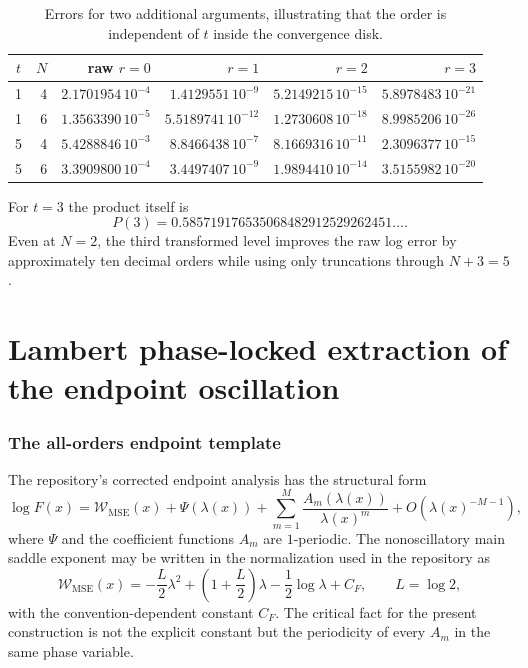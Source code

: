 \documentclass[11pt]{article}
\theoremstyle{definition}
\theoremstyle{remark}
\begin{document}
\begin{table}[htbp]
\centering
\caption{Errors for two additional arguments, illustrating that the order is independent of $t$ inside the convergence disk.}
\label{tab:numeric-other}
\begin{tabular}{@{}c r r r r r@{}}
\toprule
$t$ & $N$ & raw $r=0$ & $r=1$ & $r=2$ & $r=3$ \\
\midrule
1 & 4 & $2.1701954\,10^{-4}$ & $1.4129551\,10^{-9}$ & $5.2149215\,10^{-15}$ & $5.8978483\,10^{-21}$ \\
1 & 6 & $1.3563390\,10^{-5}$ & $5.5189741\,10^{-12}$ & $1.2730608\,10^{-18}$ & $8.9985206\,10^{-26}$ \\
5 & 4 & $5.4288846\,10^{-3}$ & $8.8466438\,10^{-7}$ & $8.1669316\,10^{-11}$ & $2.3096377\,10^{-15}$ \\
5 & 6 & $3.3909800\,10^{-4}$ & $3.4497407\,10^{-9}$ & $1.9894410\,10^{-14}$ & $3.5155982\,10^{-20}$ \\
\bottomrule
\end{tabular}
\end{table}

For $t=3$ the product itself is
\begin{equation}
P(3)=0.585719176535068482912529262451\ldots.
\label{eq:P3}
\end{equation}
Even at $N=2$, the third transformed level improves the raw log error by approximately ten decimal orders while using only truncations through $N+3=5$.

\part{Lambert phase-locked extraction of the endpoint oscillation}

\section{The all-orders endpoint template}
\label{sec:lambert-template}

The repository's corrected endpoint analysis has the structural form
\begin{equation}
\log F(x)=\mathcal W_{\mathrm{MSE}}(x)+\Psi(\lambda(x))
+\sum_{m=1}^{M}\frac{A_m(\lambda(x))}{\lambda(x)^m}
+O\!\left(\lambda(x)^{-M-1}\right),
\label{eq:endpoint-template}
\end{equation}
where $\Psi$ and the coefficient functions $A_m$ are $1$-periodic. The nonoscillatory main saddle exponent may be written in the normalization used in the repository as
\begin{equation}
\mathcal W_{\mathrm{MSE}}(x)
=-\frac{L}{2}\lambda^2+
\left(1+\frac L2\right)\lambda
-\frac12\log\lambda+C_F,
\qquad L=\log2,
\label{eq:Wmse}
\end{equation}
with the convention-dependent constant $C_F$. The critical fact for the present construction is not the explicit constant but the periodicity of every $A_m$ in the same phase variable.
\end{document}
